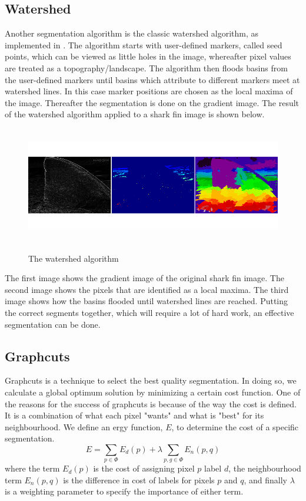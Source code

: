 \documentclass[a4paper,10pt]{article}
\begin{document}
\subsection{Watershed}
Another segmentation algorithm is the classic watershed algorithm, as
implemented in \cite{scikit}.  The algorithm starts with user-defined markers,
called seed points, which can be viewed as little holes in the image, whereafter
pixel values are treated as a topography/landscape.  The algorithm then floods
basins from the user-defined markers until basins which attribute to different
markers meet at watershed lines.  In this case marker positions are chosen as
the local maxima of the image.  Thereafter the segmentation is done on the
gradient image.  The result of the watershed algorithm applied to a shark fin
image is shown below.

\begin{figure}[H]
\centering
\includegraphics[width=5in,height=2in]{watershed.png} 
\label{fig1}
\caption{The watershed algorithm}
\end{figure}

\noindent The first image shows the gradient image of the original shark fin
image.  The second image shows the pixels that are identified as a local maxima.
 The third image shows how the basins flooded until watershed lines are reached.
 Putting the correct segments together, which will require a lot of hard work,
an effective segmentation can be done.

\subsection{Graphcuts}
Graphcuts is a technique to select the best quality segmentation.  In doing so,
we calculate a global optimum solution by minimizing a certain 
cost function.  One of the reasons for the success of graphcuts is because of
the way the cost is defined.  It is a combination of what each pixel
"wants" and what is "best" for its neighbourhood.  We define an ergy function,
$E$, to determine the cost of a specific segmentation.
\[
 E = \sum_{p \in \Phi}E_d(p) + \lambda\sum_{p,g \in \Phi}E_n(p, q)
\]
where the term $E_d(p)$ is the cost of assigning pixel $p$ label $d$, the
neighbourhood term $E_n(p, q)$ is the difference in cost of labels for pixels
$p$ 
and $q$, and finally $\lambda$ is a weighting parameter to specify the
importance of either term.
\end{document}
